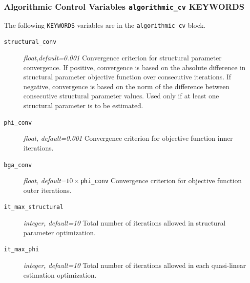 \documentclass[11pt,oneside,onecolumn]{usgsreport}
\begin{document}
\begin{appendix}
\begin{bibunit}
\subsubsection{Algorithmic Control Variables \texttt{algorithmic\_cv} KEYWORDS}

The following \texttt{KEYWORDS} variables are in the \texttt{algorithmic\_cv}
block.
\begin{description}
\item [{\texttt{structural\_conv}}] \emph{float,default=0.001} Convergence
criterion for structural parameter convergence. If positive, convergence
is based on the absolute difference in structural parameter objective
function over consecutive iterations. If negative, convergence is
based on the norm of the difference between consecutive structural
parameter values. Used only if at least one structural parameter is
to be estimated. 
\item [{\texttt{phi\_conv}}] \emph{float, default=0.001 }Convergence criterion
for objective function inner iterations. 
\item [{\texttt{bga\_conv}}] \emph{float, default=$10\times$}\texttt{phi\_conv}\emph{
}Convergence criterion for objective function outer iterations. 
\item [{\texttt{it\_max\_structural}}] \emph{integer, default=10 }Total
number of iterations allowed in structural parameter optimization.

\item [{\texttt{it\_max\_phi}}] \emph{integer, default=10 }Total number
of iterations allowed in each quasi-linear estimation optimization.


\end{description}
\end{bibunit}
\end{appendix}
\end{document}
